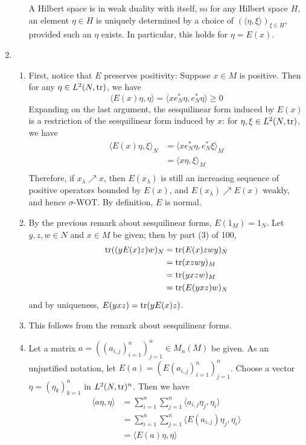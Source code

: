\documentclass[a4paper,10pt]{report}
\newcommand{\ggen}[1]{\langle#1\rangle}
\begin{document}
\begin{enumerate}
\begin{enumerate}
				A Hilbert space is in weak duality with itself, so for any Hilbert space $H$, an element $\eta\in H$ is uniquely determined by a choice of $(\ggen{\eta,\xi})_{\xi\in H}$, provided such an $\eta$ exists. In particular, this holds for $\eta=E(x)$. 
		\end{enumerate}
	\item 
		\begin{enumerate}
			\item First, notice that $E$ preserves positivity: Suppose $x\in M$ is positive. Then for any $\eta\in L^2(N,\operatorname{tr})$, we have 
				\[\ggen{E(x)\eta,\eta}=\ggen{xe_N^*\eta,e_N^*\eta}\ge0\]
				Expanding on the last argument, the sesquilinear form induced by $E(x)$ is a restriction of the sesquilinear form induced by $x$: for $\eta,\xi\in L^2(N,\operatorname{tr})$, we have 
				\begin{align*}
					\ggen{E(x)\eta,\xi}_N &= \ggen{xe_N^*\eta,e_N^*\xi}_M\\
					&= \ggen{x\eta,\xi}_M\\
				\end{align*}
				Therefore, if $x_\lambda\nearrow x$, then $E(x_\lambda)$ is still an increasing sequence of positive operators bounded by $E(x)$, and $E(x_\lambda)\nearrow E(x)$ weakly, and hence $\sigma$-WOT. By definition, $E$ is normal. 
			\item By the previous remark about sesquilinear forms, $E(1_M)=1_N$. Let $y,z,w\in N$ and $x\in M$ be given; then by part (3) of 100, 
				\begin{align*}
					\operatorname{tr}((yE(x)z)w)_N &= \operatorname{tr}(E(x)zwy)_N\\
					&= \operatorname{tr}(xzwy)_M\\
					&= \operatorname{tr}(yxzw)_M\\
					&= \operatorname{tr}(E(yxz)w)_N
				\end{align*}
				and by uniqueness, $E(yxz)=\operatorname{tr}(yE(x)z)$. 
			\item This follows from the remark about sesquilinear forms. 
			\item Let a matrix $a=((a_{i,j})_{i=1}^n)_{j=1}^n\in M_n(M)$ be given. As an unjustified notation, let $E(a)=(E(a_{i,j})_{i=1}^n)_{j=1}^n$. Choose a vector $\eta=(\eta_k)_{k=1}^n$ in $L^2(N,\operatorname{tr})^n$. Then we have 
				\begin{align*}
					\ggen{a\eta,\eta} &= \sum_{i=1}^n\sum_{j=1}^n\ggen{a_{i,j}\eta_j,\eta_i}\\
					&= \sum_{i=1}^n\sum_{j=1}^n\ggen{E(a_{i,j})\eta_j,\eta_i}\\
					&= \ggen{E(a)\eta,\eta}
				\end{align*}

\end{enumerate}
\end{enumerate}
\end{document}
